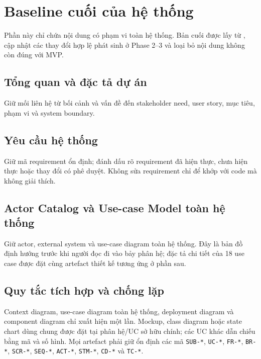 \section{Baseline cuối của hệ thống}

Phần này chỉ chứa nội dung có phạm vi toàn hệ thống. Bản cuối được lấy từ , cập nhật các thay đổi hợp lệ phát sinh ở Phase 2--3 và loại bỏ nội dung không còn đúng với MVP.

\subsection{Tổng quan và đặc tả dự án}
Giữ mối liên hệ từ bối cảnh và vấn đề đến stakeholder need, user story, mục tiêu, phạm vi và system boundary.

\subsection{Yêu cầu hệ thống}
Giữ mã requirement ổn định; đánh dấu rõ requirement đã hiện thực, chưa hiện thực hoặc thay đổi có phê duyệt. Không sửa requirement chỉ để khớp với code mà không giải thích.

\subsection{Actor Catalog và Use-case Model toàn hệ thống}
Giữ actor, external system và use-case diagram toàn hệ thống. Đây là bản đồ định hướng trước khi người đọc đi vào bảy phân hệ; đặc tả chi tiết của 18 use case được đặt cùng artefact thiết kế tương ứng ở phần sau.

\subsection{Quy tắc tích hợp và chống lặp}

Context diagram, use-case diagram toàn hệ thống, deployment diagram và component diagram chỉ xuất hiện một lần. Mockup, class diagram hoặc state chart dùng chung được đặt tại phân hệ/UC sở hữu chính; các UC khác dẫn chiếu bằng mã và số hình. Mọi artefact phải giữ ổn định các mã \texttt{SUB-*}, \texttt{UC-*}, \texttt{FR-*}, \texttt{BR-*}, \texttt{SCR-*}, \texttt{SEQ-*}, \texttt{ACT-*}, \texttt{STM-*}, \texttt{CD-*} và \texttt{TC-*}.
